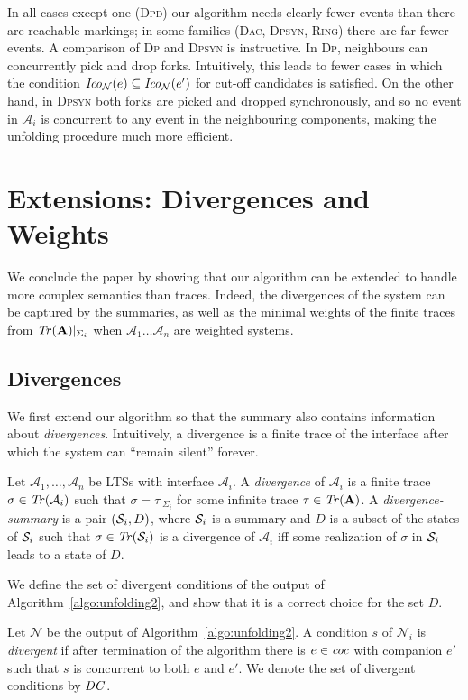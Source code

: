 \documentclass{llncs}
\def\A{\mathcal{A}}
\def\prod{\mathbf{A}}
\def\N{\mathcal{N}}
\def\S{\mathcal{S}}
\newcommand{\Tr}[1]{{\it Tr}(#1)}
\newcommand{\Coni}[2]{{\it Ico}_{#1}(#2)}
\renewcommand{\S}{{\cal S}}
\begin{document}
In all cases except one (\textsc{Dpd}) our algorithm needs clearly 
fewer events than there are reachable markings;
in some families (\textsc{Dac},
\textsc{Dpsyn}, \textsc{Ring}) there are far fewer events.
A comparison of \textsc{Dp} and \textsc{Dpsyn} is instructive. In \textsc{Dp},
neighbours can concurrently pick and drop forks. Intuitively, this leads
to fewer cases in which the condition $\Coni{\N}{e}\subseteq\Coni{\N}{e'}$
for cut-off candidates is satisfied. On the other hand, in \textsc{Dpsyn} both forks are
picked and dropped synchronously, and so no event in $\A_i$ is concurrent to any
event in the neighbouring components, making the unfolding procedure much
more efficient. 


\section{Extensions: Divergences and  Weights}

We conclude the paper by showing that our algorithm can be extended to handle more complex semantics than traces.
Indeed, the divergences of the system can be captured by the summaries, as well as the minimal weights of the finite traces from $\Tr{\prod}|_{\Sigma_i}$ when $\A_1\dots\A_n$ are weighted systems.

\subsection{Divergences}
We first extend our algorithm so that the summary
also contains information about {\em divergences}.
Intuitively, a divergence is a finite trace of the interface after which
the system can ``remain silent'' forever.

\begin{definition}
Let $\A_1, \ldots, \A_n$ be LTSs with interface $\A_i$. A 
{\em divergence} of $\A_i$ is a finite trace
$\sigma \in \Tr{\A_i}$ such that $\sigma = \tau_{|{\Sigma_i}}$ for some
infinite trace $\tau \in \Tr{\prod}$.
A {\em divergence-summary} is a pair $(\S_i, D)$, where $\S_i$ is a summary 
and $D$ is a subset of the states of $\S_i$ such that $\sigma \in \Tr{\S_i}$
is a divergence of $\A_i$ if{}f some realization of $\sigma$ in $\S_i$ 
leads to a state of $D$. 
\end{definition}

We define the set of divergent conditions of the output of Algorithm~\ref{algo:unfolding2}, and show that it is a correct choice for the set $D$.

\begin{definition}
Let $\N$ be the output of Algorithm~\ref{algo:unfolding2}. A condition $s$ of $\N_i$ is {\em divergent}
if after termination of the algorithm there is $e \in {\it coc}$ with 
companion $e'$ such that $s$ is concurrent to both $e$ and $e'$. We denote
the set of divergent conditions by ${\it DC}$.
\end{definition}
\end{document}
